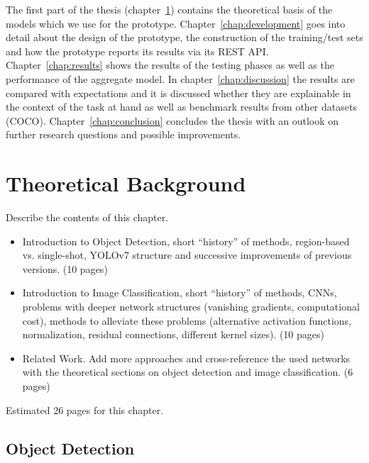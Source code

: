 \documentclass[draft,final]{vutinfth} %
\begin{document}
The first part of the thesis (chapter~\ref{chap:background}) contains
the theoretical basis of the models which we use for the
prototype. Chapter~\ref{chap:development} goes into detail about the
design of the prototype, the construction of the training/test sets
and how the prototype reports its results via its REST
API. Chapter~\ref{chap:results} shows the results of the testing
phases as well as the performance of the aggregate model. In
chapter~\ref{chap:discussion} the results are compared with
expectations and it is discussed whether they are explainable in the
context of the task at hand as well as benchmark results from other
datasets (COCO). Chapter~\ref{chap:conclusion} concludes the thesis
with an outlook on further research questions and possible
improvements.

\chapter{Theoretical Background}
\label{chap:background}

Describe the contents of this chapter.

\begin{itemize}
\item Introduction to Object Detection, short ``history'' of methods,
  region-based vs. single-shot, YOLOv7 structure and successive
  improvements of previous versions. (10 pages)
\item Introduction to Image Classification, short ``history'' of
  methods, CNNs, problems with deeper network structures (vanishing
  gradients, computational cost), methods to alleviate these problems
  (alternative activation functions, normalization, residual
  connections, different kernel sizes). (10 pages)
\item Related Work. Add more approaches and cross-reference the used
  networks with the theoretical sections on object detection and image
  classification. (6 pages)
\end{itemize}

Estimated 26 pages for this chapter.

\section{Object Detection}
\label{sec:background-detection}
\end{document}
